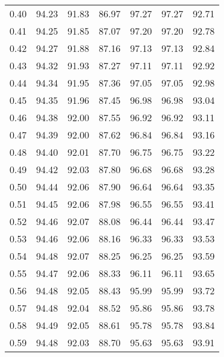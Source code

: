 \begin{tabular}{|c|c|c|c|c|c|c|}
      0.40 &     94.23 &     91.83 &      86.97 &   97.27 &      97.27 &         92.71 \\
      0.41 &     94.25 &     91.85 &      87.07 &   97.20 &      97.20 &         92.78 \\
      0.42 &     94.27 &     91.88 &      87.16 &   97.13 &      97.13 &         92.84 \\
      0.43 &     94.32 &     91.93 &      87.27 &   97.11 &      97.11 &         92.92 \\
      0.44 &     94.34 &     91.95 &      87.36 &   97.05 &      97.05 &         92.98 \\
      0.45 &     94.35 &     91.96 &      87.45 &   96.98 &      96.98 &         93.04 \\
      0.46 &     94.38 &     92.00 &      87.55 &   96.92 &      96.92 &         93.11 \\
      0.47 &     94.39 &     92.00 &      87.62 &   96.84 &      96.84 &         93.16 \\
      0.48 &     94.40 &     92.01 &      87.70 &   96.75 &      96.75 &         93.22 \\
      0.49 &     94.42 &     92.03 &      87.80 &   96.68 &      96.68 &         93.28 \\
      0.50 &     94.44 &     92.06 &      87.90 &   96.64 &      96.64 &         93.35 \\
      0.51 &     94.45 &     92.06 &      87.98 &   96.55 &      96.55 &         93.41 \\
      0.52 &     94.46 &     92.07 &      88.08 &   96.44 &      96.44 &         93.47 \\
      0.53 &     94.46 &     92.06 &      88.16 &   96.33 &      96.33 &         93.53 \\
      0.54 &     94.48 &     92.07 &      88.25 &   96.25 &      96.25 &         93.59 \\
      0.55 &     94.47 &     92.06 &      88.33 &   96.11 &      96.11 &         93.65 \\
      0.56 &     94.48 &     92.05 &      88.43 &   95.99 &      95.99 &         93.72 \\
      0.57 &     94.48 &     92.04 &      88.52 &   95.86 &      95.86 &         93.78 \\
      0.58 &     94.49 &     92.05 &      88.61 &   95.78 &      95.78 &         93.84 \\
      0.59 &     94.48 &     92.03 &      88.70 &   95.63 &      95.63 &         93.91 \\

\end{tabular}
